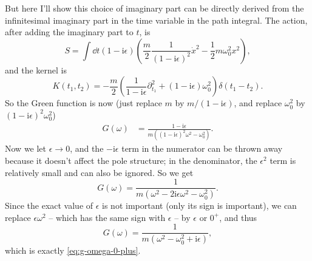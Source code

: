 \documentclass[hyperref, a4paper]{article}
\newcommand*{\ii}{\mathrm{i}}
\begin{document}
But here I'll show this choice of imaginary part can be directly derived 
from the infinitesimal imaginary part in the time variable in the path integral.
The action, after adding the imaginary part to $t$, is 
\begin{equation}
    S = \int \dd{t} (1 - \ii \epsilon) \left( \frac{m}{2} \frac{1}{(1 - \ii \epsilon)^2} \dot{x}^2 
    - \frac{1}{2} m \omega_0^2 x^2 \right),
\end{equation}
and the kernel is 
\begin{equation}
    K(t_1, t_2) = - \frac{m}{2} 
    \left(
        \frac{1}{1 - \ii \epsilon} \partial_{t_1}^2 + (1 - \ii \epsilon) \omega_0^2
    \right) \delta(t_1 - t_2).
\end{equation}
So the Green function is now 
(just replace $m$ by $m / (1 - \ii \epsilon)$, 
and replace $\omega_0^2$ by $(1 - \ii \epsilon)^2 \omega_0^2$)
\begin{equation}
    \begin{aligned}
        G(\omega) &= \frac{1 - \ii \epsilon}{m ( (1 - \ii \epsilon)^2 \omega^2 - \omega_0^2 )}.
    \end{aligned}
\end{equation}
Now we let $\epsilon \to 0$,
and the $- \ii \epsilon$ term in the numerator can be thrown away because it doesn't affect the pole structure;
in the denominator,
the $\epsilon^2$ term is relatively small and can also be ignored.
So we get 
\[
    G(\omega) = \frac{1}{m ( \omega^2 - 2 \ii \epsilon \omega^2 - \omega_0^2 )}.
\]
Since the exact value of $\epsilon$ is not important 
(only its sign is important),
we can replace $\epsilon \omega^2$ -- which has the same sign with $\epsilon$ -- by $\epsilon$ or $0^+$,
and thus 
\begin{equation}
    G(\omega) = \frac{1}{m (\omega^2 - \omega_0^2 + \ii \epsilon)},
\end{equation}
which is exactly \eqref{eq:g-omega-0-plus}.
\end{document}
